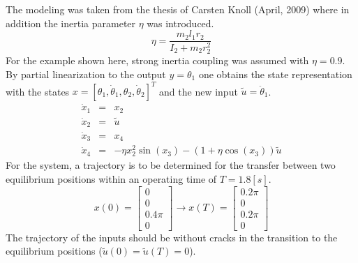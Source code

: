 \documentclass[letterpaper,10pt,english]{sphinxmanual}
\begin{document}
The modeling was taken from the thesis of Carsten Knoll
(April, 2009) where in addition the inertia parameter \(\eta\) was
introduced.
\begin{equation*}
   \eta = \frac{m_2 l_1 r_2}{I_2 + m_2 r_2^2}
\end{equation*}
For the example shown here, strong inertia coupling was assumed with
\(\eta = 0.9\). By partial linearization to the output \(y =
\theta_1\) one obtains the state representation with the states
\(x = [\theta_1, \dot{\theta}_1, \theta_2, \dot{\theta}_2]^T\) and
the new input \(\tilde{u} = \ddot{\theta}_1\).
\begin{eqnarray*}
   \dot{x}_1 & = & x_2 \\
   \dot{x}_2 & = & \tilde{u} \\
   \dot{x}_3 & = & x_4 \\
   \dot{x}_4 & = & -\eta x_2^2  \sin(x_3) - (1 + \eta \cos(x_3))\tilde{u}
\end{eqnarray*}
For the system, a trajectory is to be determined for the transfer
between two equilibrium positions within an operating time of
\(T = 1.8 [s]\).
\begin{equation*}
   x(0) = \begin{bmatrix} 0 \\ 0 \\ 0.4 \pi \\ 0 \end{bmatrix}
   \rightarrow
   x(T) = \begin{bmatrix} 0.2 \pi \\ 0 \\ 0.2 \pi \\ 0 \end{bmatrix}
\end{equation*}
The trajectory of the inputs should be without cracks in the transition
to the equilibrium positions (\(\tilde{u}(0) = \tilde{u}(T) = 0\)).
\end{document}
